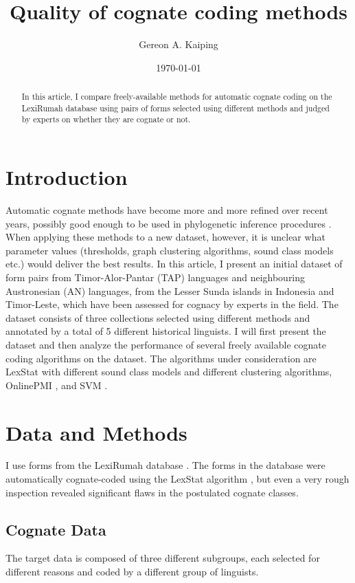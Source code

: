 \documentclass{scrartcl}
\title{Quality of cognate coding methods}
\author{Gereon A. Kaiping}
\date{\today}
\begin{document}
\maketitle
\begin{abstract}
    In this article, I compare freely-available methods for automatic cognate coding on the LexiRumah database using pairs of forms selected using different methods and judged by experts on whether they are cognate or not.
\end{abstract}


\section{Introduction}
Automatic cognate methods \parencite{lexstat,onlinepmi} have become more and more refined over recent years, possibly good enough to be used in phylogenetic inference procedures \parencite{rama2018are}. When applying these methods to a new dataset, however, it is unclear what parameter values (thresholds, graph clustering algorithms, sound class models etc.) would deliver the best results. In this article, I present an initial dataset of form pairs from Timor-Alor-Pantar (TAP) languages and neighbouring Austronesian (AN) languages, from the Lesser Sunda islands in Indonesia and Timor-Leste, which have been assessed for cognacy by experts in the field. The dataset consists of three collections selected using different methods and annotated by a total of 5 different historical linguists. I will first present the dataset and then analyze the performance of several freely available cognate coding algorithms on the dataset. The algorithms under consideration are LexStat \parencite{lexstat} with different sound class models and different clustering algorithms, OnlinePMI \parencite{onlinepmi}, and SVM \parencite{jager2016automatic,jager2017using}.

\section{Data and Methods}
I use forms from the LexiRumah database \parencite{lexirumah1}. The forms in the database were automatically cognate-coded using the LexStat algorithm \parencite{lexstat,lexirumahpaper}, but even a very rough inspection revealed significant flaws in the postulated cognate classes.

\subsection{Cognate Data}
The target data is composed of three different subgroups, each selected for different reasons and coded by a different group of linguists.
\end{document}
